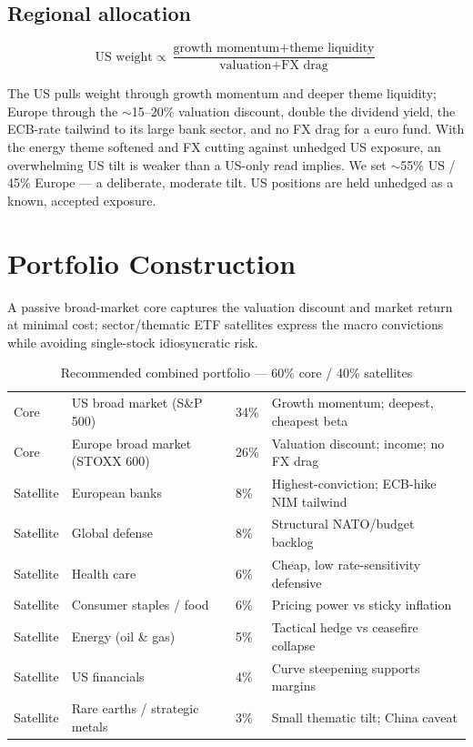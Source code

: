 \documentclass[11pt,a4paper]{article}
\begin{document}
\subsection{Regional allocation}
\[ \text{US weight} \propto \frac{\text{growth momentum} + \text{theme liquidity}}{\text{valuation} + \text{FX drag}} \]

The US pulls weight through growth momentum and deeper theme liquidity; Europe through the \(\sim\)15--20\% valuation discount, double the dividend yield, the ECB-rate tailwind to its large bank sector, and no FX drag for a euro fund. With the energy theme softened and FX cutting against unhedged US exposure, an overwhelming US tilt is weaker than a US-only read implies. We set \(\sim\)55\% US / 45\% Europe --- a deliberate, moderate tilt. US positions are held unhedged as a known, accepted exposure.

\section{Portfolio Construction}

A passive broad-market core captures the valuation discount and market return at minimal cost; sector/thematic ETF satellites express the macro convictions while avoiding single-stock idiosyncratic risk.

\begin{table}[htbp]
\caption{Recommended combined portfolio --- 60\% core / 40\% satellites}
\small
\begin{tabularx}{\linewidth}{P{1.6cm} P{4.6cm} Q{1.3cm} L}
\toprule
{} &  &  &  \\
\midrule
Core & US broad market (S\&P 500) & 34\% & Growth momentum; deepest, cheapest beta \\
Core & Europe broad market (STOXX 600) & 26\% & Valuation discount; income; no FX drag \\
Satellite & European banks & 8\% & Highest-conviction; ECB-hike NIM tailwind \\
Satellite & Global defense & 8\% & Structural NATO/budget backlog \\
Satellite & Health care & 6\% & Cheap, low rate-sensitivity defensive \\
Satellite & Consumer staples / food & 6\% & Pricing power vs sticky inflation \\
Satellite & Energy (oil \& gas) & 5\% & Tactical hedge vs ceasefire collapse \\
Satellite & US financials & 4\% & Curve steepening supports margins \\
Satellite & Rare earths / strategic metals & 3\% & Small thematic tilt; China caveat \\
\bottomrule
\end{tabularx}
\end{table}
\end{document}
